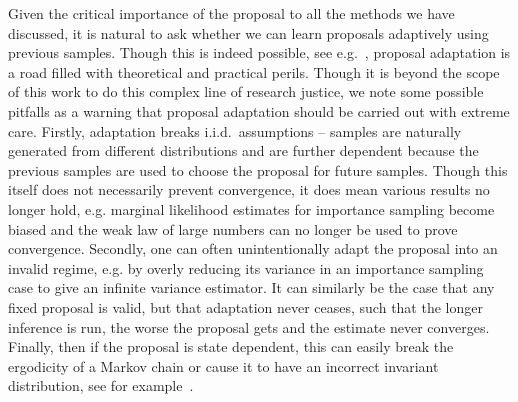 Given the critical importance of the proposal to all the methods we have discussed,
it is natural to ask whether we can learn proposals adaptively using previous samples.
Though this is indeed possible, see e.g.~\citep{gilks1992adaptive,cappe2004population,cappe2008adaptive,andrieu2008tutorial},
proposal adaptation is a road filled with theoretical and practical perils.  
Though it is beyond the scope of this work to do this complex line of research justice, we note some possible pitfalls 
as a warning that proposal adaptation should be carried out with extreme care.
Firstly, adaptation breaks i.i.d.~assumptions -- samples are naturally generated from different
distributions and are further dependent because the previous samples are used to choose the
proposal for future samples.  Though this itself does not necessarily prevent convergence, it does mean various
results no longer hold, e.g. marginal likelihood estimates for importance sampling
become biased and the weak law of large numbers can no longer be used to prove convergence.  Secondly,
one can often unintentionally adapt the proposal into an invalid regime, e.g. by overly reducing its variance in
an importance sampling case to give an infinite variance estimator.  It can similarly be the case that
any fixed proposal is valid, but that adaptation never ceases, such that the longer inference is run, the worse the
proposal gets and the estimate never converges.  Finally, then if the
proposal is state dependent, this can easily break the ergodicity of a Markov chain or cause it to
have an incorrect invariant distribution, see for example~\cite[Section 2]{andrieu2008tutorial}.